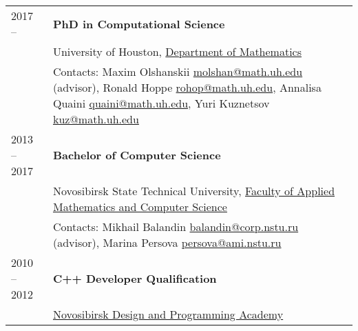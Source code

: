 \documentclass[a4paper,12pt]{article}
\begin{document}
	\begin{longtable}{ l >{\raggedright\arraybackslash}p{15cm} }
		2017 --
			& \textbf{PhD in Computational Science}\vspace{1mm}\\
		\phantom{Summer 2018} 
			& University of Houston, \href{http://www.uh.edu/nsm/math/}{Department of Mathematics}\vspace{1mm}\\
			& Contacts: Maxim Olshanskii \href{mailto:molshan@math.uh.edu}{molshan@math.uh.edu} (advisor), Ronald Hoppe \href{m
				ailto:rohop@math.uh.edu}{rohop@math.uh.edu}, 
			Annalisa Quaini \href{mailto:quaini@math.uh.edu}{quaini@math.uh.edu}, Yuri Kuznetsov \href{mailto:kuz@math.uh.edu}{kuz@math.uh.edu}\vspace{3mm}\\
		2013 -- 2017
			& \textbf{Bachelor of Computer Science}\vspace{1mm}\\%
			& Novosibirsk State Technical University, \href{https://en.nstu.ru/education/faculty-of-applied-mathematics-and-computer-science/}{Faculty of Applied Mathematics and Computer Science}\vspace{1mm}\\
			& Contacts: Mikhail Balandin \href{mailto:balandin@corp.nstu.ru}{balandin@corp.nstu.ru} (advisor), Marina Persova \href{mailto:persova@ami.nstu.ru}{persova@ami.nstu.ru}\vspace{3mm}\\
		2010 -- 2012
			& \textbf{C++ Developer Qualification}\vspace{1mm}\\
			& \href{http://www.nadip.ru/}{Novosibirsk Design and Programming Academy}\\
	\end{longtable}
\end{document}
